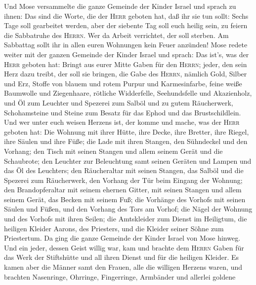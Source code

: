  Und Mose versammelte die ganze Gemeinde der Kinder Israel
und sprach zu ihnen: Das sind die Worte, die der \textsc{Herr} geboten
hat, daß ihr sie tun sollt:  Sechs Tage soll gearbeitet
werden, aber der siebente Tag soll euch heilig sein, zu feiern die
Sabbatruhe des \textsc{Herrn}. Wer da Arbeit verrichtet, der soll
sterben.  Am Sabbattag sollt ihr in allen euren Wohnungen
kein Feuer anzünden!  Mose redete weiter mit der ganzen
Gemeinde der Kinder Israel und sprach: Das ist's, was der \textsc{Herr}
geboten hat:  Bringt aus eurer Mitte Gaben für den
\textsc{Herrn}; jeder, den sein Herz dazu treibt, der soll sie bringen,
die Gabe des \textsc{Herrn}, nämlich Gold, Silber und Erz,
 Stoffe von blauem und rotem Purpur und Karmesinfarbe,
feine weiße Baumwolle und Ziegenhaare,  rötliche
Widderfelle, Seehundsfelle und Akazienholz,  und Öl zum
Leuchter und Spezerei zum Salböl und zu gutem Räucherwerk,
 Schohamsteine und Steine zum Besatz für das Ephod und das
Brustschildlein.  Und wer unter euch weisen Herzens ist,
der komme und mache, was der \textsc{Herr} geboten hat: 
Die Wohnung mit ihrer Hütte, ihre Decke, ihre Bretter, ihre Riegel, ihre
Säulen und ihre Füße;  die Lade mit ihren Stangen, den
Sühndeckel und den Vorhang;  den Tisch mit seinen Stangen
und allem seinem Gerät und die Schaubrote;  den Leuchter
zur Beleuchtung samt seinen Geräten und Lampen und das Öl des Leuchters;
 den Räucheraltar mit seinen Stangen, das Salböl und die
Spezerei zum Räucherwerk, den Vorhang der Tür beim Eingang der Wohnung;
 den Brandopferaltar mit seinem ehernen Gitter, mit
seinen Stangen und allem seinem Gerät, das Becken mit seinem Fuß;
 die Vorhänge des Vorhofs mit seinen Säulen und Füßen,
und den Vorhang des Tors am Vorhof;  die Nägel der
Wohnung und des Vorhofs mit ihren Seilen;  die
Amtskleider zum Dienst im Heiligtum, die heiligen Kleider Aarons, des
Priesters, und die Kleider seiner Söhne zum Priestertum. 
Da ging die ganze Gemeinde der Kinder Israel von Mose hinweg.
 Und ein jeder, dessen Geist willig war, kam und brachte
dem \textsc{Herrn} Gaben für das Werk der Stiftshütte und all ihren
Dienst und für die heiligen Kleider.  Es kamen aber die
Männer samt den Frauen, alle die willigen Herzens waren, und brachten
Nasenringe, Ohrringe, Fingerringe, Armbänder und allerlei goldene
